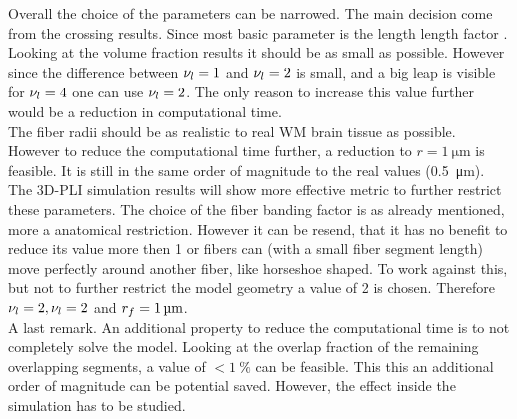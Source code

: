 \par
% 
Overall the choice of the parameters can be narrowed.
The main decision come from the crossing results.
Since most basic parameter is the length length factor \segLengthFactor{}.
Looking at the volume fraction results it should be as small as possible.
However since the difference between $\textnormal{$\nu_{l}$}=\SI{1}{}$ and $\textnormal{$\nu_{l}$}=\SI{2}{}$ is small, and a big leap is visible for $\textnormal{$\nu_{l}$}=\SI{4}{}$ one can use $\textnormal{$\nu_{l}$}=\SI{2}{}$.
The only reason to increase this value further would be a reduction in computational time.
\\
% 
The fiber radii should be as realistic to real \acs{WM} brain tissue as possible.
However to reduce the computational time further, a reduction to $r = \SI{1}{\micro\meter}$ is feasible.
It is still in the same order of magnitude to the real values (\SI{0.5}{\micro\meter}).
The \ac{3D-PLI} simulation results will show more effective metric to further restrict these parameters.
% 
The choice of the fiber banding factor is as already mentioned, more a anatomical restriction.
However it can be resend, that it has no benefit to reduce its value more then 1 or fibers can (with a small fiber segment length) move perfectly around another fiber, like horseshoe shaped.
To work against this, but not to further restrict the model geometry a value of 2 is chosen.
Therefore $\textnormal{$\nu_{l}$} = \SI{2}{}, \textnormal{$\nu_{l}$}=\SI{2}{}$ and $\fiberRadius=\SI{1}{\micro\meter}$.
\\
% 
A last remark.
An additional property to reduce the computational time is to not completely solve the model. 
Looking at the overlap fraction of the remaining overlapping segments, a value of $<\SI{1}{\percent}$ can be feasible.
This this an additional order of magnitude can be potential saved.
However, the effect inside the simulation has to be studied.
% 
